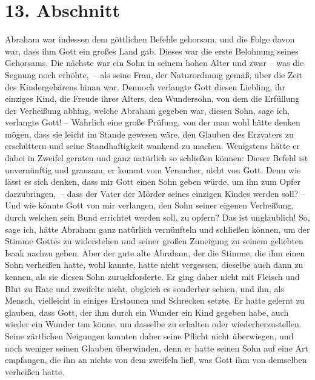 \section{13. Abschnitt} \label{kap4_ab13}

Abraham war indessen dem göttlichen Befehle gehorsam,
und die Folge davon war,
dass ihm Gott ein großes Land gab. Dieses war die erste Belohnung seines
Gehorsams. Die nächste war ein Sohn in seinem hohen Alter und zwar -- was die
Segnung noch erhöhte,~-- als seine Frau, der Naturordnung gemäß, über die Zeit
des Kindergebärens hinan war.
Dennoch verlangte Gott diesen
Liebling, ihr einziges Kind, die Freude ihres Alters, den Wundersohn, von dem
die Erfüllung der Verheißung abhing, welche Abraham gegeben war, diesen Sohn,
sage ich, verlangte Gott! -- Wahrlich eine große Prüfung, von der man wohl hätte
denken mögen, dass sie leicht im Stande gewesen wäre, den Glauben des Erzvaters
zu erschüttern und seine Standhaftigkeit wankend zu machen. Wenigstens hätte er
dabei in Zweifel geraten und ganz natürlich so schließen können: Dieser Befehl
ist unvernünftig und grausam, er kommt vom Versucher, nicht von Gott. Denn wie
lässt es sich denken, dass mir Gott einen Sohn geben würde, um ihn zum Opfer
darzubringen,~-- dass der Vater der Mörder seines einzigen Kindes werden soll?
-- Und wie könnte Gott von mir verlangen, den Sohn seiner eigenen Verheißung,
durch welchen sein Bund errichtet werden soll, zu opfern? Das ist unglaublich!
So, sage ich, hätte Abraham ganz natürlich vernünfteln und schließen können, um
der Stimme Gottes zu widerstehen und seiner großen Zuneigung zu seinem geliebten
Isaak nachzu geben. Aber der gute alte Abraham, der die
Stimme, die ihm einen
Sohn verheißen hatte, wohl kannte, hatte nicht vergessen, dieselbe auch dann zu
kennen, als sie diesen Sohn zuruckforderte. Er ging daher nicht mit Fleisch und
Blut zu Rate und zweifelte nicht, obgleich es sonderbar schien, und ihn, als
Mensch, vielleicht in einiges Erstaunen und Schrecken setzte. Er hatte gelernt
zu glauben, dass Gott, der ihm durch ein Wunder ein Kind gegeben habe, auch
wieder ein Wunder tun könne, um dasselbe zu erhalten oder wiederherzustellen.
Seine zärtlichen Neigungen konnten daher seine Pflicht nicht überwiegen, und
noch weniger seinen Glauben überwinden, denn er hatte seinen Sohn auf eine Art
empfangen, die ihn an nichts von dem zweifeln ließ, was Gott ihm von demselben
verheißen hatte.

\medskip


